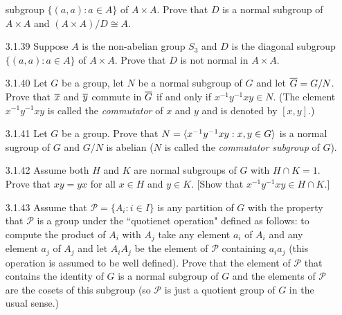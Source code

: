 \begin{enumerate}
                  subgroup $\{(a, a) : a \in A\}$ of $A \times A$. Prove that
                  $D$ is a normal subgroup of $A \times A$ and
                  $(A \times A)/D \cong A$.
   \item[3.1.39]  Suppose $A$ is the non-abelian group $S_3$ and $D$ is the
                  diagonal subgroup $\{(a, a) : a \in A\}$ of $A \times A$.
                  Prove that $D$ is not normal in $A \times A$.
   \item[3.1.40]  Let $G$ be a group, let $N$ be a normal subgroup of $G$ and
                  let $\overline{G} = G/N$. Prove that $\overline{x}$ and $\overline{y}$ commute in
                  $\overline{G}$ if and only if $x^{-1}y^{-1}xy \in N$. (The element
                  $x^{-1}y^{-1}xy$ is called the \textit{commutator} of $x$ and
                  $y$ and is denoted by $[x, y]$.)
   \item[3.1.41]  Let $G$ be a group. Prove that
                  $N = \langle x^{-1}y^{-1}xy : x, y \in G \rangle$ is a normal sugroup of
                  $G$ and $G/N$ is abelian ($N$ is called the
                  \textit{commutator subgroup} of $G$).
   \item[3.1.42]  Assume both $H$ and $K$ are normal subgroups of $G$ with
                  $H \cap K = 1$. Prove that $xy = yx$ for all $x \in H$ and
                  $y \in K$. [Show that $x^{-1}y^{-1}xy \in H \cap K$.]
   \item[3.1.43]  Assume that $\mathcal{P} = \{A_i : i \in I\}$ is any partition
                  of $G$ with the property that $\mathcal{P}$ is a group under
                  the ``quotienet operation" defined as follows: to compute the
                  product of $A_i$ with $A_j$ take any element $a_i$ of $A_i$
                  and any element $a_j$ of $A_j$ and let $A_iA_j$ be the element
                  of $\mathcal{P}$ containing $a_ia_j$ (this operation is
                  assumed to be well defined). Prove that the element of
                  $\mathcal{P}$ that contains the identity of $G$ is a normal
                  subgroup of $G$ and the elements of $\mathcal{P}$ are the
                  cosets of this subgroup (so $\mathcal{P}$ is just a quotient
                  group of $G$ in the usual sense.)
\end{enumerate}
